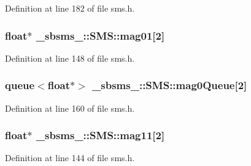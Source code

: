 Definition at line 182 of file sms.\+h.

\subsubsection[{\texorpdfstring{mag01}{mag01}}]{\setlength{\rightskip}{0pt plus 5cm}float$\ast$ \+\_\+sbsms\+\_\+\+::\+S\+M\+S\+::mag01\mbox{[}2\mbox{]}\hspace{0.3cm}{\ttfamily [protected]}}\hypertarget{class__sbsms___1_1_s_m_s_af71417ced8ac120d14af72ede7838536}{}\label{class__sbsms___1_1_s_m_s_af71417ced8ac120d14af72ede7838536}


Definition at line 148 of file sms.\+h.

\subsubsection[{\texorpdfstring{mag0\+Queue}{mag0Queue}}]{\setlength{\rightskip}{0pt plus 5cm}queue$<$float$\ast$$>$ \+\_\+sbsms\+\_\+\+::\+S\+M\+S\+::mag0\+Queue\mbox{[}2\mbox{]}\hspace{0.3cm}{\ttfamily [protected]}}\hypertarget{class__sbsms___1_1_s_m_s_a0718982012b902fba72e3e3ef089a95d}{}\label{class__sbsms___1_1_s_m_s_a0718982012b902fba72e3e3ef089a95d}


Definition at line 160 of file sms.\+h.

\subsubsection[{\texorpdfstring{mag11}{mag11}}]{\setlength{\rightskip}{0pt plus 5cm}float$\ast$ \+\_\+sbsms\+\_\+\+::\+S\+M\+S\+::mag11\mbox{[}2\mbox{]}\hspace{0.3cm}{\ttfamily [protected]}}\hypertarget{class__sbsms___1_1_s_m_s_a4333616e918bf780cf1586c1bad7240d}{}\label{class__sbsms___1_1_s_m_s_a4333616e918bf780cf1586c1bad7240d}


Definition at line 144 of file sms.\+h.

